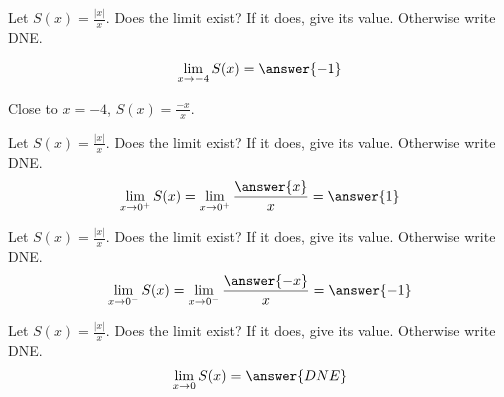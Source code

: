 \documentclass{ximera}
\author{Steven Gubkin\and Nela Lakos}
\begin{document}
\begin{exercise}

Let $S(x) = \frac{|x|}{x}$.  Does the limit exist?  If it
does, give its value.  Otherwise write DNE.



\[
\lim_{x \to -4} S(x) = \answer{-1}
\] 

\begin{hint}
  Close to $x=-4$, $S(x)=\frac{-x}{x}$.
\end{hint}
\begin{exercise}
Let $S(x) = \frac{|x|}{x}$.  Does the limit exist?  If it
does, give its value.  Otherwise write DNE.
\[
\lim_{x \to 0^{+}} S(x) =\lim_{x \to 0^{+}} \frac{\answer{x}}{x} = \answer{1}
\] 
\begin{exercise}
Let $S(x) = \frac{|x|}{x}$.  Does the limit exist?  If it
does, give its value.  Otherwise write DNE.
\[
\lim_{x \to 0^{-}} S(x) =\lim_{x \to 0^{-}} \frac{\answer{-x}}{x} = \answer{-1}
\] 
\begin{exercise}
Let $S(x) = \frac{|x|}{x}$.  Does the limit exist?  If it
does, give its value.  Otherwise write DNE.
\[
\lim_{x \to 0} S(x) = \answer{DNE}
\] 
\end{exercise}
\end{exercise}
\end{exercise}
\end{exercise}
\end{document}
